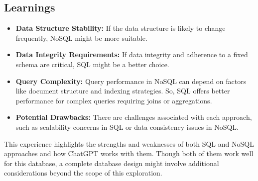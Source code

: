\documentclass{article}
\begin{document}
\subsection{Learnings}
\begin{itemize}
    
\item \textbf{Data Structure Stability:} If the data structure is likely to change frequently, NoSQL might be more suitable.

\item \textbf{Data Integrity Requirements: } If data integrity and adherence to a fixed schema are critical, SQL might be a better choice.

\item \textbf{Query Complexity: } Query performance in NoSQL can depend on factors like document structure and indexing strategies. So, SQL offers better performance for complex queries requiring joins or aggregations.

\item \textbf{Potential Drawbacks: } There are challenges associated with each approach, such as scalability concerns in SQL or data consistency issues in NoSQL.

\end{itemize}
\nextline \nextline
This experience highlights the strengths and weaknesses of both SQL and NoSQL approaches and how ChatGPT works with them. Though both of them work well for this database, a complete database design might involve additional considerations beyond the scope of this exploration.
\end{document}
